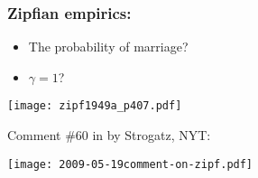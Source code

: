\begin{frame}
  \frametitle{Zipfian empirics:}

  \begin{itemize}
  \item The probability of marriage?
  \item $\gamma = 1$?
  \end{itemize}
  \begin{center}
    \texttt{[image: zipf1949a\_p407.pdf]}
  \end{center}

\end{frame}

\begin{frame}[plain]


  \begin{block}{
      \small
      Comment \#60 in 
      by Strogatz, NYT:}

    \texttt{[image: 2009-05-19comment-on-zipf.pdf]}

  \end{block}
\end{frame}

